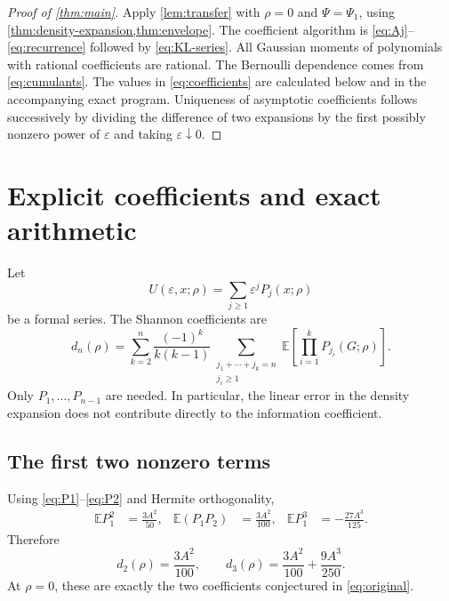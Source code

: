 \documentclass[11pt,a4paper]{article}
\numberwithin{equation}{section}
\theoremstyle{definition}
\theoremstyle{remark}
\newcommand{\E}{\mathbb E}
\newcommand{\eps}{\varepsilon}
\begin{document}
\begin{proof}[Proof of \cref{thm:main}]
Apply \cref{lem:transfer} with $\rho=0$ and $\Psi=\Psi_1$, using
\cref{thm:density-expansion,thm:envelope}. The coefficient algorithm is
\eqref{eq:Aj}--\eqref{eq:recurrence} followed by \eqref{eq:KL-series}.
All Gaussian moments of polynomials with rational coefficients are rational.
The Bernoulli dependence comes from \eqref{eq:cumulants}. The values in
\eqref{eq:coefficients} are calculated below and in the accompanying exact
program. Uniqueness of asymptotic coefficients follows successively by dividing
the difference of two expansions by the first possibly nonzero power of
$\eps$ and taking $\eps\downarrow0$.
\end{proof}

\section{Explicit coefficients and exact arithmetic}
\label{sec:explicit}

Let
\begin{equation}
 U(\eps,x;\rho)=\sum_{j\ge1}\eps^jP_j(x;\rho)
 \label{eq:formal-U}
\end{equation}
be a formal series. The Shannon coefficients are
\begin{equation}
 d_n(\rho)=\sum_{k=2}^{n}\frac{(-1)^k}{k(k-1)}
 \sum_{\substack{j_1+\cdots+j_k=n\\j_i\ge1}}
 \E\!\left[\prod_{i=1}^{k}P_{j_i}(G;\rho)\right].
 \label{eq:coefficient-formula}
\end{equation}
Only $P_1,\ldots,P_{n-1}$ are needed. In particular, the linear error in the
density expansion does not contribute directly to the information coefficient.

\subsection{The first two nonzero terms}

Using \eqref{eq:P1}--\eqref{eq:P2} and Hermite orthogonality,
\begin{align}
 \E P_1^2&=\frac{3A^2}{50},&
 \E(P_1P_2)&=\frac{3A^2}{100},&
 \E P_1^3&=-\frac{27A^3}{125}.
 \label{eq:low-moments}
\end{align}
Therefore
\begin{equation}
 d_2(\rho)=\frac{3A^2}{100},\qquad
 d_3(\rho)=\frac{3A^2}{100}+\frac{9A^3}{250}.
 \label{eq:prefix-low}
\end{equation}
At $\rho=0$, these are exactly the two coefficients conjectured in
\eqref{eq:original}.
\end{document}
